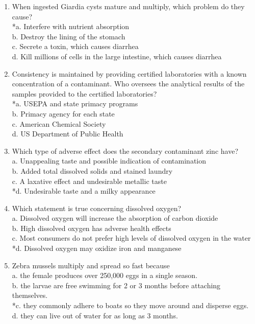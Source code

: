 \begin{enumerate}[1.]
  \item When ingested Giardia cysts mature and multiply, which problem do they cause?\\
*a. Interfere with nutrient absorption\\
b. Destroy the lining of the stomach\\
c. Secrete a toxin, which causes diarrhea\\
d. Kill millions of cells in the large intestine, which causes diarrhea\\

  \item Consistency is maintained by providing certified laboratories with a known concentration of a contaminant. Who oversees the analytical results of the samples provided to the certified laboratories?\\
*a. USEPA and state primacy programs\\
b. Primacy agency for each state\\
c. American Chemical Society\\
d. US Department of Public Health\\

  \item Which type of adverse effect does the secondary contaminant zinc have?\\
a. Unappealing taste and possible indication of contamination\\
b. Added total dissolved solids and stained laundry\\
c. A laxative effect and undesirable metallic taste\\
*d. Undesirable taste and a milky appearance\\
  \item Which statement is true concerning dissolved oxygen?\\
a. Dissolved oxygen will increase the absorption of carbon dioxide\\
b. High dissolved oxygen has adverse health effects\\
c. Most consumers do not prefer high levels of dissolved oxygen in the water\\
*d. Dissolved oxygen may oxidize iron and manganese\\

  \item Zebra mussels multiply and spread so fast because\\
a. the female produces over 250,000 eggs in a single season.\\
b. the larvae are free swimming for 2 or 3 months before attaching themselves.\\
*c. they commonly adhere to boats so they move around and disperse eggs.\\
d. they can live out of water for as long as 3 months.\\


\end{enumerate}
